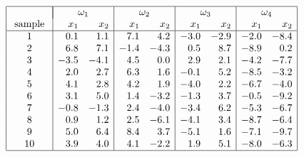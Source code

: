 \documentclass[a4paper,11pt,onecolumn,oneside,UTF8]{article}
\begin{document}
$$
    \begin{array}{|c|rr|rr|rr|rr|}
        \hline           & \multicolumn{2}{|c|} {\omega_{1}} & \multicolumn{2}{c|} {\omega_{2}} & \multicolumn{2}{c|} {\omega_{3}} & \multicolumn{2}{c|} {\omega_{4}}                                 \\
        \text { sample } & x_{1}                             & x_{2}                            & x_{1}                            & x_{2}                            & x_{1} & x_{2} & x_{1} & x_{2} \\
        \hline 1         & 0.1                               & 1.1                              & 7.1                              & 4.2                              & -3.0  & -2.9  & -2.0  & -8.4  \\
        2                & 6.8                               & 7.1                              & -1.4                             & -4.3                             & 0.5   & 8.7   & -8.9  & 0.2   \\
        3                & -3.5                              & -4.1                             & 4.5                              & 0.0                              & 2.9   & 2.1   & -4.2  & -7.7  \\
        4                & 2.0                               & 2.7                              & 6.3                              & 1.6                              & -0.1  & 5.2   & -8.5  & -3.2  \\
        5                & 4.1                               & 2.8                              & 4.2                              & 1.9                              & -4.0  & 2.2   & -6.7  & -4.0  \\
        6                & 3.1                               & 5.0                              & 1.4                              & -3.2                             & -1.3  & 3.7   & -0.5  & -9.2  \\
        7                & -0.8                              & -1.3                             & 2.4                              & -4.0                             & -3.4  & 6.2   & -5.3  & -6.7  \\
        8                & 0.9                               & 1.2                              & 2.5                              & -6.1                             & -4.1  & 3.4   & -8.7  & -6.4  \\
        9                & 5.0                               & 6.4                              & 8.4                              & 3.7                              & -5.1  & 1.6   & -7.1  & -9.7  \\
        10               & 3.9                               & 4.0                              & 4.1                              & -2.2                             & 1.9   & 5.1   & -8.0  & -6.3  \\
        \hline
    \end{array}
$$
\end{document}
